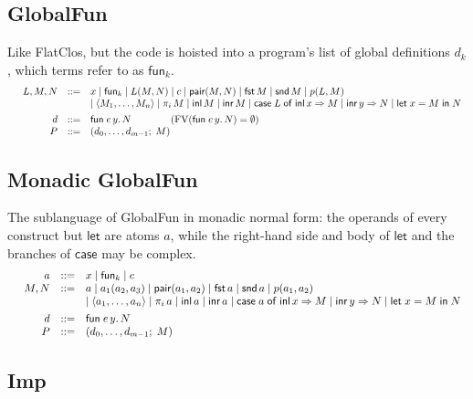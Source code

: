 \documentclass[10pt]{article}
\makeatletter
\theoremstyle{acmplain}
\newcommand{\key}[1]{\mathsf{#1}}
\newcommand{\Let}{\key{let}\;}
\newcommand{\In}{\;\key{in}\;}
\newcommand{\inl}{\key{inl}\,}
\newcommand{\inr}{\key{inr}\,}
\newcommand{\Case}[5]{\key{case}\;#1\;\key{of}\;\key{inl}\,#2 \Rightarrow #3 \mid \key{inr}\,#4 \Rightarrow #5}
\newcommand{\tuple}[1]{\langle #1 \rangle}
\newcommand{\prj}[1]{\pi_{#1}\,}
\newcommand{\funref}[1]{\key{fun}_{#1}}
\newcommand{\pair}[2]{\key{pair}(#1, #2)}
\newcommand{\FST}{\key{fst}\,}
\newcommand{\SND}{\key{snd}\,}
\newcommand{\prim}[3]{#1(#2, #3)}
\newcommand{\FV}{\mathrm{FV}}
\newenvironment{syntax}{\[\begin{array}{l@{\quad}rcl}}{\end{array}\]}
\makeatother
\begin{document}
\subsection{GlobalFun}

Like FlatClos, but the code is hoisted into a program's list of global definitions $d_k$, which terms refer to as $\funref{k}$.
\begin{syntax}
  & L, M, N &::=& x \mid \funref{k} \mid L(M, N) \mid c
    \mid \pair{M}{N} \mid \FST M \mid \SND M \mid \prim{p}{L}{M} \\
  &&& \mid \tuple{M_1,\ldots,M_n} \mid \prj{i} M
    \mid \inl M \mid \inr M \mid \Case{L}{x}{M}{y}{N}
    \mid \Let x = M \In N \\[1ex]
  & d &::=& \key{fun}\; e\,y.\,N \qquad\qquad (\FV(\key{fun}\; e\,y.\,N) = \emptyset) \\
  & P &::=& (d_0, \ldots, d_{m-1};\; M)
\end{syntax}

\subsection{Monadic GlobalFun}

The sublanguage of GlobalFun in monadic normal form: the operands of every construct but $\key{let}$ are atoms $a$, while the right-hand side and body of $\key{let}$ and the branches of $\key{case}$ may be complex.
\begin{syntax}
  & a &::=& x \mid \funref{k} \mid c \\
  & M, N &::=& a \mid a_1(a_2, a_3) \mid \pair{a_1}{a_2} \mid \FST a \mid \SND a
    \mid \prim{p}{a_1}{a_2} \\
  &&& \mid \tuple{a_1,\ldots,a_n} \mid \prj{i} a
    \mid \inl a \mid \inr a \mid \Case{a}{x}{M}{y}{N}
    \mid \Let x = M \In N \\[1ex]
  & d &::=& \key{fun}\; e\,y.\,N \\
  & P &::=& (d_0, \ldots, d_{m-1};\; M)
\end{syntax}

\subsection{Imp}
\end{document}

